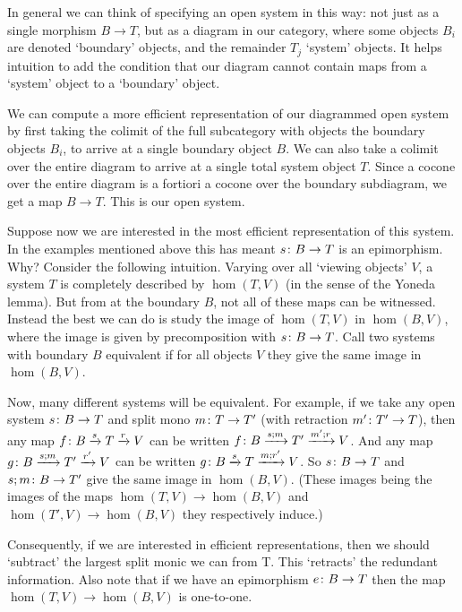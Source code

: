 In general we can think of specifying an open system in this way: not just as a
single morphism $B \to T$, but as a diagram in our category, where some objects
$B_i$ are denoted `boundary' objects, and the remainder $T_j$ `system' objects. It
helps intuition to add the condition that our diagram cannot contain maps from a
`system' object to a `boundary' object.

We can compute a more efficient representation of our diagrammed open system by
first taking the colimit of the full subcategory with objects the boundary
objects $B_i$, to arrive at a single boundary object $B$. We can also take a
colimit over the entire diagram to arrive at a single total system object $T$.
Since a cocone over the entire diagram is a fortiori a cocone over the boundary
subdiagram, we get a map $B \to T$. This is our open system.

Suppose now we are interested in the most efficient representation of this
system. In the examples mentioned above this has meant $s{\colon} B \to T$ is an
epimorphism. Why? Consider the following intuition. Varying over all `viewing
objects' $V$, a system $T$ is completely described by $\hom(T,V)$ (in the sense
of the Yoneda lemma).  But from at the boundary $B$, not all of these maps can
be witnessed. Instead the best we can do is study the image of $\hom(T,V)$ in
$\hom(B,V)$, where the image is given by precomposition with $s{\colon} B \to T$.
Call two systems with boundary $B$ equivalent if for all objects $V$ they give
the same image in $\hom(B,V)$.

Now, many different systems will be equivalent. For example, if we take any open
system $s{\colon} B \to T$ and split mono $m{\colon} T \to T'$ (with retraction
$m'{\colon} T' \to T$), then any map $f{\colon} B \xrightarrow{s} T \xrightarrow{r} V$
can be written $f{\colon} B \xrightarrow{s;m} T' \xrightarrow{m';r} V$.  And any
map $g{\colon} B \xrightarrow{s;m} T' \xrightarrow{r'}V$ can be written $g{\colon} B
\xrightarrow{s} T \xrightarrow{m;r'} V$. So $s{\colon} B \to T$ and $s;m{\colon} B \to
T'$ give the same image in $\hom(B,V)$.  (These images being the images of the
maps $\hom(T,V) \to \hom(B,V)$ and $\hom(T',V) \to \hom(B,V)$ they respectively
induce.)

Consequently, if we are interested in efficient representations, then we should
`subtract' the largest split monic we can from T. This `retracts' the redundant
information. Also note that if we have an epimorphism $e{\colon} B \to T$ then the
map $\hom(T,V) \to \hom(B,V)$ is one-to-one.

